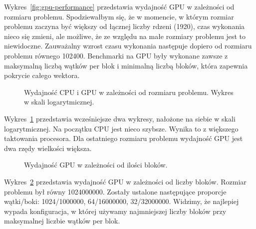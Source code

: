 \documentclass{article}
\begin{document}
    Wykres~\ref{fig:gpu-performance} przedstawia wydajność GPU w zależności od rozmiaru problemu.
    Spodziewałbym się, że w momencie, w którym rozmiar problemu zaczyna być większy
    od łącznej liczby rdzeni (1920), czas wykonania nieco się zmieni, ale
    możliwe, że ze względu na małe rozmiary problemu jest to niewidoczne.
    Zauważalny wzrost czasu wykonania następuje dopiero od rozmiaru problemu równego 102400.
    Benchmarki na GPU były wykonane zawsze z maksymalną liczbą wątków per blok i minimalną
    liczbą bloków, która zapewnia pokrycie całego wektora.

    \begin{figure}[H]
        \centering
        
        \caption{Wydajność CPU i GPU w zależności od rozmiaru problemu.
        Wykres w skali logarytmicznej.}
        \label{fig:cpu-gpu-performance}
    \end{figure}

    Wykres~\ref{fig:cpu-gpu-performance} przedstawia wcześniejsze dwa wykresy, nałożone na
    siebie w skali logarytmicznej.
    Na początku CPU jest nieco szybsze.
    Wynika to z większego taktowania procesora.
    Dla ostatniego rozmiaru problemu wydajność GPU jest dwa rzędy wielkości większa.

    \begin{figure}[H]
        \centering
        
        \caption{Wydajność GPU w zależności od ilości bloków.}
        \label{fig:gpu-block-performance}
    \end{figure}
    Wykres~\ref{fig:gpu-block-performance} przedstawia wydajność GPU w zależności od
    liczby bloków.
    Rozmiar problemu był równy 1024000000.
    Zostały ustalone następujące proporcje wątki/boki:
    1024/1000000, 64/16000000, 32/32000000.
    Widzimy, że najlepiej wypada konfiguracja, w której używamy najmniejszej liczby bloków
    przy maksymalnej liczbie wątków per blok.


\end{document}
